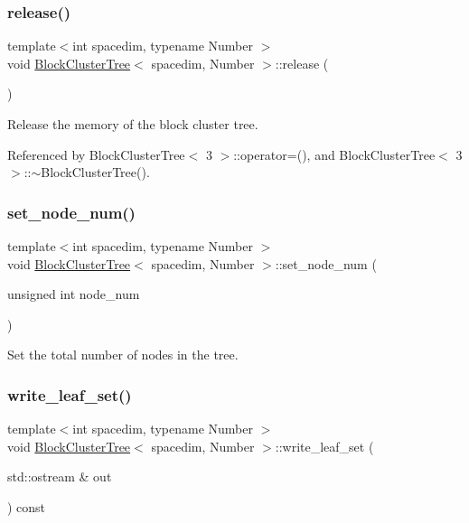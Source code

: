 \subsubsection{\texorpdfstring{release()}{release()}}
{\footnotesize\ttfamily template$<$int spacedim, typename Number $>$ \\
void \hyperlink{classBlockClusterTree}{Block\+Cluster\+Tree}$<$ spacedim, Number $>$\+::release (\begin{DoxyParamCaption}{ }\end{DoxyParamCaption})}

Release the memory of the block cluster tree. 

Referenced by Block\+Cluster\+Tree$<$ 3 $>$\+::operator=(), and Block\+Cluster\+Tree$<$ 3 $>$\+::$\sim$\+Block\+Cluster\+Tree().

\mbox{\label{classBlockClusterTree_a02be4a882acca918386ad024769925bc}} 
\subsubsection{\texorpdfstring{set\+\_\+node\+\_\+num()}{set\_node\_num()}}
{\footnotesize\ttfamily template$<$int spacedim, typename Number $>$ \\
void \hyperlink{classBlockClusterTree}{Block\+Cluster\+Tree}$<$ spacedim, Number $>$\+::set\+\_\+node\+\_\+num (\begin{DoxyParamCaption}\item[{unsigned int}]{node\+\_\+num }\end{DoxyParamCaption})}

Set the total number of nodes in the tree. \mbox{\label{classBlockClusterTree_aef01b51b0530536bc5481492d4719375}} 
\subsubsection{\texorpdfstring{write\+\_\+leaf\+\_\+set()}{write\_leaf\_set()}\hspace{0.1cm}{\footnotesize\ttfamily [1/2]}}
{\footnotesize\ttfamily template$<$int spacedim, typename Number $>$ \\
void \hyperlink{classBlockClusterTree}{Block\+Cluster\+Tree}$<$ spacedim, Number $>$\+::write\+\_\+leaf\+\_\+set (\begin{DoxyParamCaption}\item[{std\+::ostream \&}]{out }\end{DoxyParamCaption}) const}

